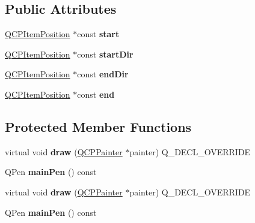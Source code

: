 \subsection*{Public Attributes}
\begin{DoxyCompactItemize}
\item 
\hyperlink{class_q_c_p_item_position}{Q\+C\+P\+Item\+Position} $\ast$const {\bfseries start}\hypertarget{class_q_c_p_item_curve_a052f51bfd8f71cff68378bd58d271e61}{}\label{class_q_c_p_item_curve_a052f51bfd8f71cff68378bd58d271e61}

\item 
\hyperlink{class_q_c_p_item_position}{Q\+C\+P\+Item\+Position} $\ast$const {\bfseries start\+Dir}\hypertarget{class_q_c_p_item_curve_a025846914e79c6aa6b7f7e3a63135862}{}\label{class_q_c_p_item_curve_a025846914e79c6aa6b7f7e3a63135862}

\item 
\hyperlink{class_q_c_p_item_position}{Q\+C\+P\+Item\+Position} $\ast$const {\bfseries end\+Dir}\hypertarget{class_q_c_p_item_curve_aacf3dbe6a36784a5bd0ff9445a91c95b}{}\label{class_q_c_p_item_curve_aacf3dbe6a36784a5bd0ff9445a91c95b}

\item 
\hyperlink{class_q_c_p_item_position}{Q\+C\+P\+Item\+Position} $\ast$const {\bfseries end}\hypertarget{class_q_c_p_item_curve_a16048c9df53d45a87d6385d4e18ab620}{}\label{class_q_c_p_item_curve_a16048c9df53d45a87d6385d4e18ab620}

\end{DoxyCompactItemize}
\subsection*{Protected Member Functions}
\begin{DoxyCompactItemize}
\item 
virtual void {\bfseries draw} (\hyperlink{class_q_c_p_painter}{Q\+C\+P\+Painter} $\ast$painter) Q\+\_\+\+D\+E\+C\+L\+\_\+\+O\+V\+E\+R\+R\+I\+DE\hypertarget{class_q_c_p_item_curve_a856ae61de18278847ba5e0e357bf68f2}{}\label{class_q_c_p_item_curve_a856ae61de18278847ba5e0e357bf68f2}

\item 
Q\+Pen {\bfseries main\+Pen} () const \hypertarget{class_q_c_p_item_curve_a8089126f5645b6edfbaddea49d1e8390}{}\label{class_q_c_p_item_curve_a8089126f5645b6edfbaddea49d1e8390}

\item 
virtual void {\bfseries draw} (\hyperlink{class_q_c_p_painter}{Q\+C\+P\+Painter} $\ast$painter) Q\+\_\+\+D\+E\+C\+L\+\_\+\+O\+V\+E\+R\+R\+I\+DE\hypertarget{class_q_c_p_item_curve_a0c702ef5d0b7858e2da20c01f98c9981}{}\label{class_q_c_p_item_curve_a0c702ef5d0b7858e2da20c01f98c9981}

\item 
Q\+Pen {\bfseries main\+Pen} () const \hypertarget{class_q_c_p_item_curve_a8089126f5645b6edfbaddea49d1e8390}{}\label{class_q_c_p_item_curve_a8089126f5645b6edfbaddea49d1e8390}

\end{DoxyCompactItemize}
